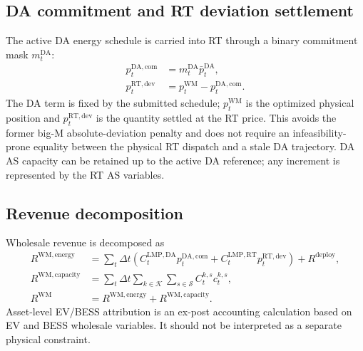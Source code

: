 \documentclass[final,5p,times]{elsarticle}
\newcommand{\DeltaT}{\Delta t}
\newcommand{\DA}{\mathrm{DA}}
\newcommand{\RT}{\mathrm{RT}}
\newcommand{\WM}{\mathrm{WM}}
\newcommand{\energy}{\mathrm{energy}}
\newcommand{\capacity}{\mathrm{capacity}}
\newcommand{\calK}{\mathcal{K}}
\newcommand{\calS}{\mathcal{S}}
\begin{document}
\subsection{DA commitment and RT deviation settlement}
The active DA energy schedule is carried into RT through a binary commitment mask $m_t^{\DA}$:
\begin{align}
p_t^{\DA,\mathrm{com}}&=m_t^{\DA}\bar p_t^{\DA},\label{eq:app_da_commitment}\\
p_t^{\RT,\mathrm{dev}}&=p_t^{\WM}-p_t^{\DA,\mathrm{com}}.\label{eq:app_rt_deviation}
\end{align}
The DA term is fixed by the submitted schedule; $p_t^{\WM}$ is the optimized physical position and $p_t^{\RT,\mathrm{dev}}$ is the quantity settled at the RT price. This avoids the former big-M absolute-deviation penalty and does not require an infeasibility-prone equality between the physical RT dispatch and a stale DA trajectory. DA AS capacity can be retained up to the active DA reference; any increment is represented by the RT AS variables.

\subsection{Revenue decomposition}
Wholesale revenue is decomposed as
\begin{align}
R^{\WM,\energy}&=\sum_t\DeltaT\left(C_t^{\mathrm{LMP},\DA}p_t^{\DA,\mathrm{com}}+C_t^{\mathrm{LMP},\RT}p_t^{\RT,\mathrm{dev}}\right)+R^{\mathrm{deploy}},\label{eq:app_energy_rev}\\
R^{\WM,\capacity}&=\sum_t\DeltaT\sum_{k\in\calK}\sum_{s\in\calS}C_t^{k,s}c_t^{k,s},\label{eq:app_capacity_rev}\\
R^{\WM}&=R^{\WM,\energy}+R^{\WM,\capacity}.\label{eq:app_total_rev}
\end{align}
Asset-level EV/BESS attribution is an ex-post accounting calculation based on EV and BESS wholesale variables. It should not be interpreted as a separate physical constraint.






\end{document}
